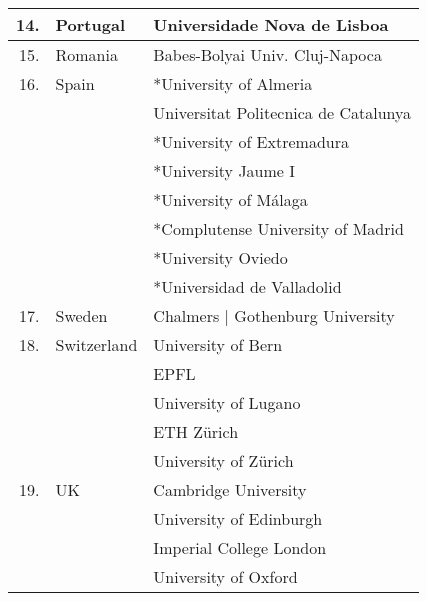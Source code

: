 {{\begin{table}[h]
\begin{center}
\begin{tabular}  {|r|l|l|}
 \hline
14.& Portugal  & Universidade Nova de Lisboa \\
 \hline
15.&Romania  & Babes-Bolyai Univ. Cluj-Napoca \\
\hline
16.&Spain  & *University of Almeria \\
&  & Universitat Politecnica de Catalunya \\
&  &  *University of Extremadura\\
&  &  *University Jaume I\\
&    & *University of M\' alaga \\
&  &  *Complutense University of Madrid\\
&  &  *University Oviedo\\
&  & *Universidad de Valladolid \\
\hline
17.& Sweden   &  Chalmers | Gothenburg University\\
\hline
18.&Switzerland   & University of Bern\\
& & EPFL \\
&  &  University of Lugano \\
 &    & ETH Z\" urich \\
&   &  University of Z\" urich\\
\hline
19.&UK   &  Cambridge University\\
&   &  University of Edinburgh\\
 &  & Imperial College London\\
&  & University of Oxford \\
\hline
\end{tabular}
\end{center}
\label{tab:names}
\end{table}
}}
\newpage
